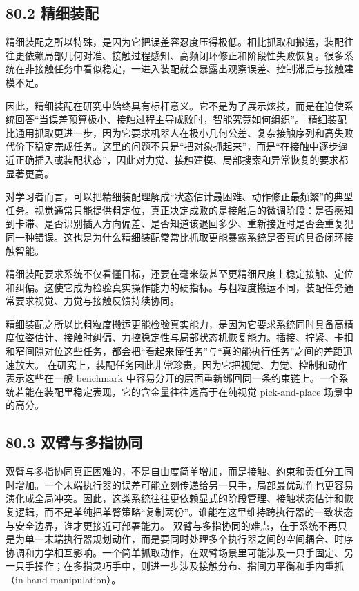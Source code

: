 \subsection*{80.2 精细装配}


精细装配之所以特殊，是因为它把误差容忍度压得极低。相比抓取和搬运，装配往往更依赖局部几何对准、接触过程感知、高频闭环修正和阶段性失败恢复。很多系统在非接触任务中看似稳定，一进入装配就会暴露出观察误差、控制滞后与接触建模不足。

因此，精细装配在研究中始终具有标杆意义。它不是为了展示炫技，而是在迫使系统回答“当误差预算极小、接触过程主导成败时，智能究竟如何组织”。 精细装配比通用抓取更进一步，因为它要求机器人在极小几何公差、复杂接触序列和高失败代价下稳定完成任务。这里的问题不只是“把对象抓起来”，而是“在接触中逐步逼近正确插入或装配状态”，因此对力觉、接触建模、局部搜索和异常恢复的要求都显著更高。

对学习者而言，可以把精细装配理解成“状态估计最困难、动作修正最频繁”的典型任务。视觉通常只能提供粗定位，真正决定成败的是接触后的微调阶段：是否感知到卡滞、是否识别插入方向偏差、是否知道该退回多少、重新接近时是否会重复犯同一种错误。这也是为什么精细装配常常比抓取更能暴露系统是否真的具备闭环接触智能。

精细装配要求系统不仅看懂目标，还要在毫米级甚至更精细尺度上稳定接触、定位和纠偏。这使它成为检验真实操作能力的硬指标。与粗粒度搬运不同，装配任务通常要求视觉、力觉与接触反馈持续协同。

精细装配之所以比粗粒度搬运更能检验真实能力，是因为它要求系统同时具备高精度位姿估计、接触时纠偏、力控稳定性与局部状态机恢复能力。插接、拧紧、卡扣和窄间隙对位这些任务，都会把“看起来懂任务”与“真的能执行任务”之间的差距迅速放大。 在研究上，装配任务因此非常珍贵，因为它把视觉、力觉、控制和动作表示这些在一般 benchmark 中容易分开的层面重新绑回同一条约束链上。一个系统若能在装配里稳定表现，它的含金量往往远高于在纯视觉 pick-and-place 场景中的高分。

\subsection*{80.3 双臂与多指协同}


双臂与多指协同真正困难的，不是自由度简单增加，而是接触、约束和责任分工同时增加。一个末端执行器的误差可能立刻传递给另一只手，局部最优动作也更容易演化成全局冲突。因此，这类系统往往更依赖显式的阶段管理、接触状态估计和恢复逻辑，而不是单纯把单臂策略“复制两份”。谁能在这里维持跨执行器的一致状态与安全边界，谁才更接近可部署能力。 双臂与多指协同的难点，在于系统不再只是为单一末端执行器规划动作，而是要同时处理多个执行器之间的空间耦合、时序协调和力学相互影响。一个简单抓取动作，在双臂场景里可能涉及一只手固定、另一只手操作；在多指灵巧手中，则进一步涉及接触分布、指间力平衡和手内重抓（in-hand manipulation）。

